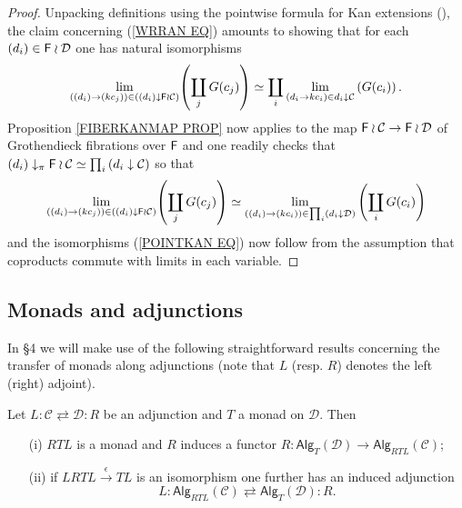 \documentclass[a4paper,10pt]{article}%
\begin{document}
\begin{proof}
	Unpacking definitions using the pointwise formula for Kan extensions (\cite[X.3.1]{McL}), the claim concerning (\ref{WRRAN EQ}) amounts to showing that for each $(d_i) \in \mathsf{F} \wr \mathcal{D}$ one has natural isomorphisms
	\begin{equation}\label{POINTKAN EQ}
	\underset{((d_i) \to (kc_j))\in
	\left( (d_i) \downarrow \mathsf{F} \wr \mathcal{C} \right) }{\lim} {\left(\coprod_j{G(c_j)}\right)}
		\simeq	
	\coprod_i \underset{(d_i  \to kc_i) \in d_i \downarrow \mathcal{C}}{\lim}
	\left(G(c_i)\right).
	\end{equation}
Proposition \ref{FIBERKANMAP PROP} now applies to 
the map $\mathsf{F} \wr \mathcal{C} \to \mathsf{F} \wr \mathcal{D}$ of Grothendieck fibrations over $\mathsf{F}$ and one readily checks that
$(d_i)\downarrow_{\pi} \mathsf{F} \wr \mathcal{C} \simeq
\prod_{i}{(d_i\downarrow \mathcal{C})}
$
so that 
	\[
	\underset{((d_i) \to (kc_j))\in
	\left( (d_i)\downarrow \mathsf{F} \wr \mathcal{C} \right) }{\lim} {\left(\coprod_j{G(c_j)}\right)}
		\simeq	
	\underset{((d_i) \to (kc_i))\in
	\prod_{i} \left( {d_i \downarrow \mathcal{D}} \right)}{\lim}
	\left(\coprod_i{G(c_i)}\right)
	\]
and the isomorphisms (\ref{POINTKAN EQ}) now follow from the assumption that coproducts commute with limits in each variable.
\end{proof}



\subsection{Monads and adjunctions}

In \S 4 we will make use of the following straightforward results concerning the transfer of monads along adjunctions
(note that $L$ (resp. $R$) denotes the left (right) adjoint).


\begin{proposition}\label{MONADADJ1 PROP}
Let
$
L \colon \mathcal{C} \rightleftarrows \mathcal{D} \colon R
$
be an adjunction and $T$ a monad on $\mathcal{D}$.
Then
\begin{itemize}
\item[(i)] $RTL$ is a monad and $R$ induces a functor
$R \colon \mathsf{Alg}_T(\mathcal{D}) \to \mathsf{Alg}_{RTL}(\mathcal{C})$;
\item[(ii)] if $LRTL \xrightarrow{\epsilon} TL$ is an isomorphism one further has an induced adjunction
\[
L \colon \mathsf{Alg}_{RTL}(\mathcal{C})
	\rightleftarrows
\mathsf{Alg}_{T}(\mathcal{D}) \colon R.
\]
\end{itemize}
\end{proposition}
\end{document}

